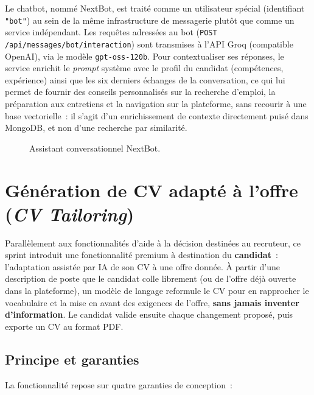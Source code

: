 Le chatbot, nommé NextBot, est traité comme un utilisateur spécial (identifiant
\texttt{"bot"}) au sein de la même infrastructure de messagerie plutôt que comme un service
indépendant. Les requêtes adressées au bot (\texttt{POST /api/messages/bot/interaction})
sont transmises à l'API Groq (compatible OpenAI), via le modèle \texttt{gpt-oss-120b}. Pour
contextualiser ses réponses, le service enrichit le \textit{prompt} système avec le profil du
candidat (compétences, expérience) ainsi que les six derniers échanges de la conversation,
ce qui lui permet de fournir des conseils personnalisés sur la recherche d'emploi, la
préparation aux entretiens et la navigation sur la plateforme, sans recourir à une base
vectorielle~: il s'agit d'un enrichissement de contexte directement puisé dans MongoDB,
et non d'une recherche par similarité.

\begin{figure}[H]
  \centering
  \caption{Assistant conversationnel NextBot.}
  \label{fig:chatbot}
\end{figure}

\section{Génération de CV adapté à l'offre (\textit{CV Tailoring})}

Parallèlement aux fonctionnalités d'aide à la décision destinées au recruteur, ce sprint introduit une fonctionnalité premium à destination du \textbf{candidat}~: l'adaptation assistée par IA de son CV à une offre donnée. À partir d'une description de poste que le candidat colle librement (ou de l'offre déjà ouverte dans la plateforme), un modèle de langage reformule le CV pour en rapprocher le vocabulaire et la mise en avant des exigences de l'offre, \textbf{sans jamais inventer d'information}. Le candidat valide ensuite chaque changement proposé, puis exporte un CV au format PDF.

\subsection{Principe et garanties}

La fonctionnalité repose sur quatre garanties de conception~:

